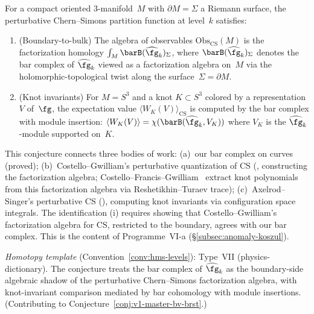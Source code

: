 \begin{conjecture}
\label{conj:cs-factorization}
For a compact oriented $3$-manifold~$M$ with
$\partial M = \Sigma$ a Riemann surface, the perturbative
Chern--Simons partition function at level~$k$ satisfies:
\begin{enumerate}[label=\textup{(\roman*)}]
\item \textup{(Boundary-to-bulk)}\quad
 The algebra of observables $\mathrm{Obs}_{\mathrm{CS}}(M)$
 is the factorization homology
 $\int_M \barB(\widehat{\fg}_k)_\Sigma$,
 where $\barB(\widehat{\fg}_k)_\Sigma$ denotes the bar complex
 of $\widehat{\fg}_k$ viewed as a factorization algebra on~$M$
 via the holomorphic-topological twist along the
 surface~$\Sigma = \partial M$.
\item \textup{(Knot invariants)}\quad
 For $M = S^3$ and a knot $K \subset S^3$ colored by a
 representation $V$ of~$\fg$, the expectation value
 $\langle W_K(V) \rangle_{\mathrm{CS}}$ is computed by the
 bar complex with module insertion:
 $\langle W_K(V) \rangle = \chi(\barB(\widehat{\fg}_k, V_K))$
 where $V_K$ is the $\widehat{\fg}_k$-module supported on~$K$.
\end{enumerate}
\end{conjecture}

\begin{remark}[Scope]\label{rem:cs-scope}
This conjecture connects three bodies of work:
(a)~our bar complex on curves (proved);
(b)~Costello--Gwilliam's perturbative quantization of CS
(\cite{CG17}, constructing the factorization algebra;
Costello--Francis--Gwilliam~\cite{CFG25} extract knot
polynomials from this factorization algebra via
Reshetikhin--Turaev trace);
(c)~Axelrod--Singer's perturbative CS (\cite{Kon94}),
computing knot invariants via configuration space integrals.
The identification (i) requires showing that Costello--Gwilliam's
factorization algebra for CS, restricted to the boundary, agrees
with our bar complex. This is the content of Programme~VI-a
(\S\ref{subsec:anomaly-koszul}).

\emph{Homotopy template} (Convention~\ref{conv:hms-levels}): Type~VII (physics-dictionary).
The conjecture treats the bar complex of $\widehat{\fg}_k$ as the
boundary-side algebraic shadow of the perturbative Chern--Simons
factorization algebra, with knot-invariant comparison mediated by bar
cohomology with module insertions.
(Contributing to Conjecture~\ref{conj:v1-master-bv-brst}.)
\end{remark}


